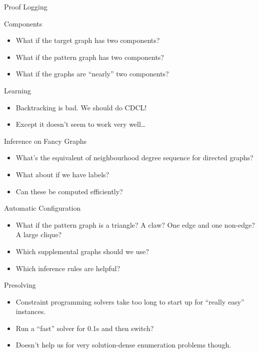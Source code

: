 \documentclass[aspectratio=169,compress,10pt]{beamer}
\begin{document}
\begin{frame}{Proof Logging}
\end{frame}

\begin{frame}{Components}
    \begin{itemize}
        \item What if the target graph has two components?
        \item <2-> What if the pattern graph has two components?
        \item <3-> What if the graphs are ``nearly'' two components?
    \end{itemize}
\end{frame}

\begin{frame}{Learning}
    \begin{itemize}
        \item Backtracking is bad. We should do CDCL!
        \item Except it doesn't seem to work very well\ldots
    \end{itemize}
\end{frame}

\begin{frame}{Inference on Fancy Graphs}
    \begin{itemize}
        \item What's the equivalent of neighbourhood degree sequence for directed graphs?
        \item What about if we have labels?
        \item Can these be computed efficiently?
    \end{itemize}
\end{frame}

\begin{frame}{Automatic Configuration}
    \begin{itemize}
        \item What if the pattern graph is a triangle? A claw? One edge and one non-edge? A large
            clique?
        \item <2-> Which supplemental graphs should we use?
        \item <2-> Which inference rules are helpful?
    \end{itemize}
\end{frame}

\begin{frame}{Presolving}
    \begin{itemize}
        \item Constraint programming solvers take too long to start up for ``really easy'' instances.
        \item Run a ``fast'' solver for 0.1s and then switch?
        \item <2-> Doesn't help us for very solution-dense enumeration problems though.
    \end{itemize}
\end{frame}
\end{document}
